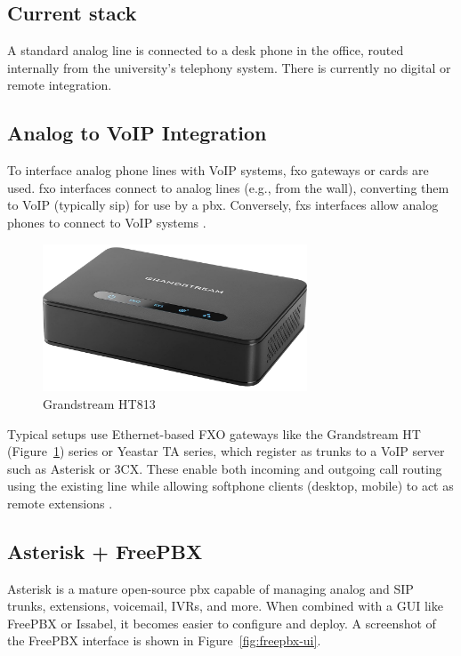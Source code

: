 \subsection*{Current stack}

A standard analog line is connected to a desk phone in the office, routed internally from the university's telephony system. There is currently no digital or remote integration.

\subsection*{Analog to VoIP Integration}

To interface analog phone lines with VoIP systems, \gls{fxo} gateways or cards are used. \gls{fxo} interfaces connect to analog lines (e.g., from the wall), converting them to VoIP (typically \gls{sip}) for use by a \gls{pbx}. Conversely, \gls{fxs} interfaces allow analog phones to connect to VoIP systems \cite{yeastar-fxo-fxs-2024}.

\begin{figure}[H]
  \centering
  \includegraphics[width=0.7\textwidth]{imaxes/grandstream-ht.png}
  \caption{Grandstream HT813}
  \label{fig:grandstream-ht}
\end{figure}

Typical setups use Ethernet-based FXO gateways like the Grandstream HT (Figure~\ref{fig:grandstream-ht}) series or Yeastar TA series, which register as trunks to a VoIP server such as Asterisk or 3CX. These enable both incoming and outgoing call routing using the existing line while allowing softphone clients (desktop, mobile) to act as remote extensions \cite{yeastar-fxo-fxs-2024}.

\subsection*{Asterisk + FreePBX}

Asterisk is a mature open-source \gls{pbx} capable of managing analog and SIP trunks, extensions, voicemail, IVRs, and more. When combined with a GUI like FreePBX or Issabel, it becomes easier to configure and deploy. A screenshot of the FreePBX interface is shown in Figure~\ref{fig:freepbx-ui}.

